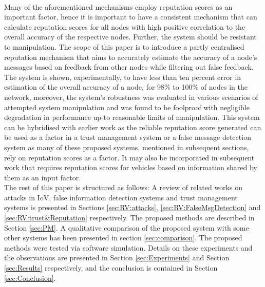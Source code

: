 \documentclass[journal]{IEEEtran}
\begin{document}
\\Many of the aforementioned mechanisms employ reputation scores as an important factor, hence it is important to have a consistent mechanism that can calculate reputation scores for all nodes with high positive correlation to the overall accuracy of the respective nodes. Further, the system should be resistant to manipulation. The scope of this paper is to introduce a partly centralised reputation mechanism that aims to accurately estimate the accuracy of a node's messages based on feedback from other nodes while filtering out false feedback. The system is shown, experimentally, to have less than ten percent error in estimation of the overall accuracy of a node, for 98\% to 100\% of nodes in the network, moreover, the system's robustness was evaluated in various scenarios of attempted system manipulation and was found to be foolproof with negligible degradation in performance up-to reasonable limits of manipulation. This system can be hybridised with earlier work as the reliable reputation score generated can be used as a factor in a trust management system or a false message detection system as many of these proposed systems, mentioned in subsequent sections, rely on reputation scores as a factor. It may also be incorporated in subsequent work that requires reputation scores for vehicles based on information shared by them as an input factor.
\\The rest of this paper is structured as follows: A review of related works on attacks in IoV, false information detection systems and trust management systems is presented in Sections \ref{sec:RV:attacks}, \ref{sec:RV:FalseMsgDetection} and \ref{sec:RV:trust&Reputation} respectively. The proposed methods are described in Section \ref{sec:PM}. A qualitative comparison of the proposed system with some other systems has been presented in section \ref{sec:comparison}. The proposed methods were tested via software simulation. Details on these experiments and the observations are presented in Section \ref{sec:Experiments} and Section \ref{sec:Results} respectively, and the conclusion is contained in Section \ref{sec:Conclusion}.

 


\end{document}
